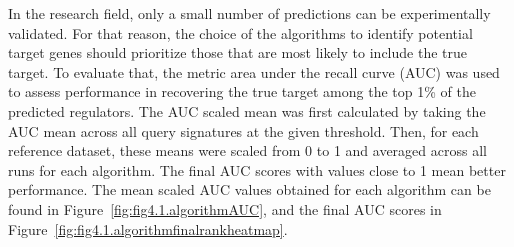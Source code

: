 In the research field, only a small number of predictions can be experimentally validated. For that reason, the choice of the algorithms to identify potential target genes should prioritize those that are most likely to include the true target. To evaluate that, the metric area under the recall curve (\gls{AUC}) was used to assess performance in recovering the true target among the top 1\% of the predicted regulators. The \gls{AUC} scaled mean was first calculated by taking the \gls{AUC} mean across all query signatures at the given threshold. Then, for each reference dataset, these means were scaled from 0 to 1 and averaged across all runs for each algorithm. The final \gls{AUC} scores with values close to 1 mean better performance. The mean scaled \gls{AUC} values obtained for each algorithm can be found in Figure~\ref{fig:fig4.1.algorithmAUC}, and the final \gls{AUC} scores in Figure~\ref{fig:fig4.1.algorithmfinalrankheatmap}. 


